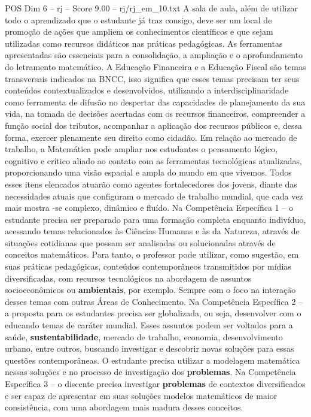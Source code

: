 \begin{textsample}{POS Dim 6 – rj – Score 9.00 – rj/rj\_em\_10.txt}
A sala de aula, além de utilizar todo o aprendizado que o estudante já traz consigo, deve ser um local de promoção de ações que ampliem os conhecimentos científicos e que sejam utilizadas como recursos didáticos nas práticas pedagógicas.
As ferramentas apresentadas são essenciais para a consolidação, a ampliação e o aprofundamento do letramento matemático.
A Educação Financeira e a Educação Fiscal são temas transversais indicados na BNCC, isso significa que esses temas precisam ter seus conteúdos contextualizados e desenvolvidos, utilizando a interdisciplinaridade como ferramenta de difusão no despertar das capacidades de planejamento da sua vida, na tomada de decisões acertadas com os recursos financeiros, compreender a função social dos tributos, acompanhar a aplicação dos recursos públicos e, dessa forma, exercer plenamente seu direito como cidadão.
Em relação ao mercado de trabalho, a Matemática pode ampliar nos estudantes o pensamento lógico, cognitivo e crítico aliado ao contato com as ferramentas tecnológicas atualizadas, proporcionando uma visão espacial e ampla do mundo em que vivemos.
Todos esses itens elencados atuarão como agentes fortalecedores dos jovens, diante das necessidades atuais que configuram o mercado de trabalho mundial, que cada vez mais mostra -se complexo, dinâmico e fluído.
Na Competência Específica 1 – o estudante precisa ser preparado para uma formação completa enquanto indivíduo, acessando temas relacionados às Ciências Humanas e às da Natureza, através de situações cotidianas que possam ser analisadas ou solucionadas através de conceitos matemáticos.
Para tanto, o professor pode utilizar, como sugestão, em suas práticas pedagógicas, conteúdos contemporâneos transmitidos por mídias diversificadas, com recursos tecnológicos na abordagem de assuntos socioeconômicos ou \textbf{ambientais}, por exemplo.
Sempre com o foco na interação desses temas com outras Áreas de Conhecimento.
Na Competência Específica 2 – a proposta para os estudantes precisa ser globalizada, ou seja, desenvolver com o educando temas de caráter mundial.
Esses assuntos podem ser voltados para a saúde, \textbf{sustentabilidade}, mercado de trabalho, economia, desenvolvimento urbano, entre outros, buscando investigar e descobrir novas soluções para essas questões contemporâneas.
O estudante precisa utilizar a modelagem matemática nessas soluções e no processo de investigação dos \textbf{problemas}.
Na Competência Específica 3 – o discente precisa investigar \textbf{problemas} de contextos diversificados e ser capaz de apresentar em suas soluções modelos matemáticos de maior consistência, com uma abordagem mais madura desses conceitos.

\end{textsample}
